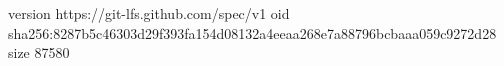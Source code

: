 version https://git-lfs.github.com/spec/v1
oid sha256:8287b5c46303d29f393fa154d08132a4eeaa268e7a88796bcbaaa059c9272d28
size 87580
